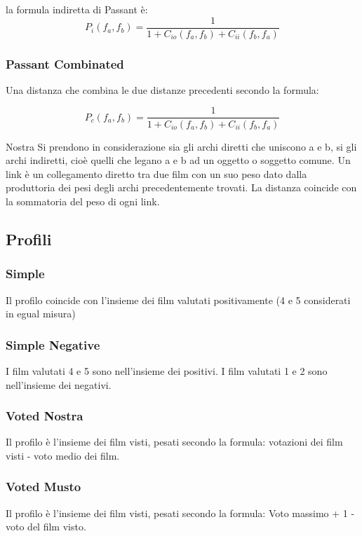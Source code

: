 la formula indiretta di Passant è:
    \begin{equation}
        P_{i}(f_{a},f_{b}) = \frac{1} {1+C_{io}(f_{a},f_{b})+C_{ii}(f_{b},f_{a})}
    \end{equation}


\subsubsection{Passant Combinated}
Una distanza che combina le due distanze precedenti secondo la formula:

    \begin{equation}
P_{c}(f_{a},f_{b}) = \frac{1} {1+C_{io}(f_{a},f_{b})+C_{ii}(f_{b},f_{a})}
    \end{equation}


Nostra
Si prendono in considerazione sia gli archi diretti che uniscono a e b, si gli archi indiretti, cioè quelli che legano a e b ad un oggetto o soggetto comune.
Un link è un collegamento diretto tra due film con un suo peso dato dalla produttoria dei pesi degli archi precedentemente trovati.
La distanza coincide con la sommatoria del peso di ogni link.



\subsection{Profili}

\subsubsection{Simple}
Il profilo coincide con l'insieme dei film valutati positivamente (4 e 5 considerati in egual misura)

\subsubsection{Simple Negative}

I film valutati 4 e 5 sono nell'insieme dei positivi. I film valutati 1 e 2 sono nell'insieme dei negativi.


\subsubsection{Voted Nostra}


Il profilo è l'insieme dei film visti, pesati secondo la formula:
votazioni dei film visti - voto medio dei film.

\subsubsection{Voted Musto}

Il profilo è l'insieme dei film visti, pesati secondo la formula:
Voto massimo + 1 - voto del film visto. 


